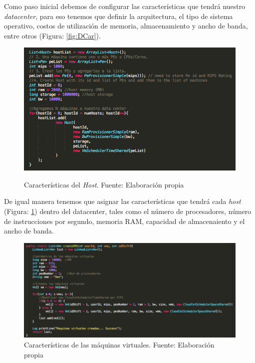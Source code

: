 Como paso inicial debemos de configurar las características que tendrá nuestro \textit{datacenter}, para eso tenemos que definir la arquitectura, el tipo de sistema operativo, costos de utilización de memoria, almacenamiento y ancho de banda, entre otros (Figura: \ref{fig:DCar}).

\renewcommand\thefigure{\arabic{figure}}
\begin{figure}[h!]
	\centering
	\includegraphics[scale=0.4]{media/caracteristicas_host}
	\label{fig:HCar}
	\caption{Características del \textit{Host}. Fuente: Elaboración propia}
\end{figure}

De igual manera tenemos que asignar las características que tendrá cada \textit{host} (Figura: \ref{fig:HCar}) dentro del datacenter, tales como el número de procesadores, número de instrucciones por segundo, memoria RAM, capacidad de almacenaiento y el ancho de banda.

\renewcommand\thefigure{\arabic{figure}}
\begin{figure}[h!]
	\centering
	\includegraphics[scale=0.4]{media/creacion_vm}
	\caption{Características de las máquinas virtuales. Fuente: Elaboración propia}
	\label{fig:VCar}
\end{figure}

